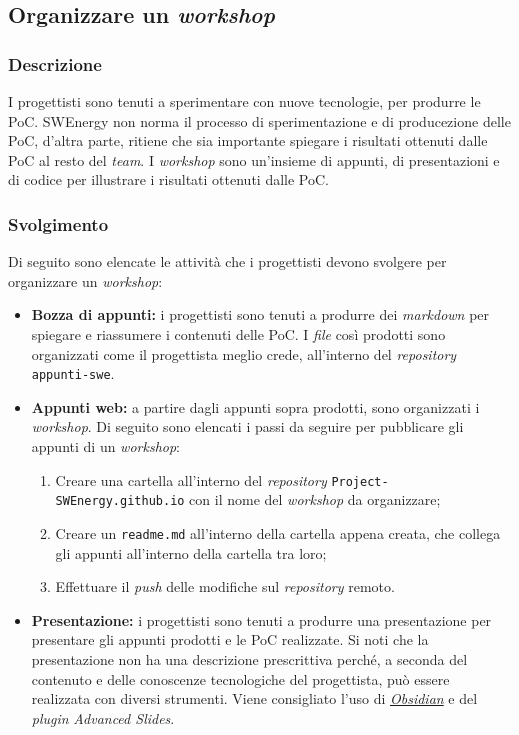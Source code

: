 \subsection{Organizzare un \textit{workshop}}

\subsubsection{Descrizione}

I progettisti sono tenuti a sperimentare con nuove tecnologie, per produrre le
PoC. SWEnergy non norma il processo di sperimentazione e di producezione delle
PoC, d'altra parte, ritiene che sia importante spiegare i risultati ottenuti
dalle PoC al resto del \textit{team}. I \textit{workshop} sono un'insieme di
appunti, di presentazioni e di codice per illustrare i risultati ottenuti dalle
PoC.

\subsubsection{Svolgimento}
Di seguito sono elencate le attività che i progettisti devono svolgere per
organizzare un \textit{workshop}:
\begin{itemize}
	\item \textbf{Bozza di appunti:} i progettisti sono tenuti a produrre dei
	      \textit{markdown} per spiegare e riassumere i contenuti delle PoC. I
	      \textit{file} così prodotti sono organizzati come il progettista
	      meglio crede, all'interno del \textit{repository}
	      \texttt{appunti-swe}.

	\item \textbf{Appunti web:} a partire dagli appunti sopra prodotti, sono
	      organizzati i \textit{workshop}. Di seguito sono elencati i passi da
	      seguire per pubblicare gli appunti di un \textit{workshop}:
	      \begin{enumerate}
		      \item Creare una cartella all'interno del \textit{repository}
		            \texttt{Project-SWEnergy.github.io} con il nome del
		            \textit{workshop} da organizzare;

		      \item Creare un \texttt{readme.md} all'interno della
		            cartella appena creata, che collega gli appunti all'interno
		            della cartella tra loro;

		      \item Effettuare il \textit{push} delle modifiche sul
		            \textit{repository} remoto.
	      \end{enumerate}

	\item \textbf{Presentazione:} i progettisti sono tenuti a produrre una
	      presentazione per presentare gli appunti prodotti e le PoC realizzate.
	      Si noti che la presentazione non ha una descrizione prescrittiva
	      perché, a seconda del contenuto e delle conoscenze tecnologiche del
	      progettista, può essere realizzata con diversi strumenti. Viene
	      consigliato l'uso di \href{https://obsidian.md/}{\textit{Obsidian}} e
	      del \textit{plugin} \textit{Advanced Slides}.
\end{itemize}
